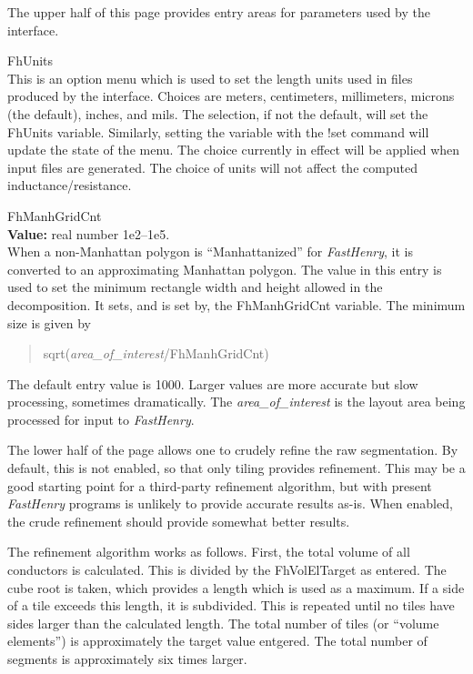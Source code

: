 The upper half of this page provides entry areas for parameters used
by the interface.

\begin{description}
\item{\cb FhUnits}\\
This is an option menu which is used to set the length units used in
files produced by the interface.  Choices are meters, centimeters,
millimeters, microns (the default), inches, and mils.  The selection,
if not the default, will set the {\et FhUnits} variable.  Similarly,
setting the variable with the {\cb !set} command will update the state
of the menu.  The choice currently in effect will be applied when
input files are generated.  The choice of units will not affect the
computed inductance/resistance.

\item{\et FhManhGridCnt}\\
{\bf Value:} real number 1e2--1e5.\\
When a non-Manhattan polygon is ``Manhattanized'' for {\it FastHenry},
it is converted to an approximating Manhattan polygon.  The value in
this entry is used to set the minimum rectangle width and height
allowed in the decomposition.  It sets, and is set by, the {\cb
FhManhGridCnt} variable.  The minimum size is given by
\begin{quote}
{\vt sqrt(}{\it area\_of\_interest\/}{\vt /FhManhGridCnt)}
\end{quote}
The default entry value is 1000.  Larger values are more accurate
but slow processing, sometimes dramatically.  The {\it
area\_of\_interest} is the layout area being processed for input to
{\it FastHenry}.
\end{description}

The lower half of the page allows one to crudely refine the raw
segmentation.  By default, this is not enabled, so that only tiling
provides refinement.  This may be a good starting point for a
third-party refinement algorithm, but with present {\it FastHenry}
programs is unlikely to provide accurate results as-is.  When enabled,
the crude refinement should provide somewhat better results.

The refinement algorithm works as follows.  First, the total volume of
all conductors is calculated.  This is divided by the {\cb
FhVolElTarget} as entered.  The cube root is taken, which provides a
length which is used as a maximum.  If a side of a tile exceeds this
length, it is subdivided.  This is repeated until no tiles have sides
larger than the calculated length.  The total number of tiles (or
``volume elements'') is approximately the target value entgered.  The
total number of segments is approximately six times larger.

